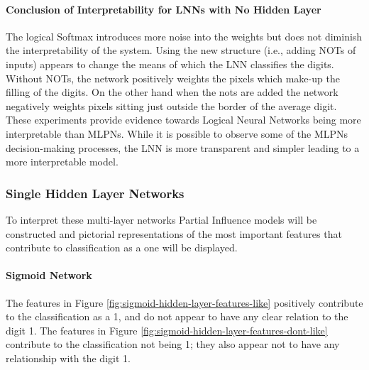 \paragraph{Conclusion of Interpretability for LNNs with No Hidden Layer}
The logical Softmax introduces more noise into the weights but does not diminish the interpretability of the system. Using the new structure (i.e., adding NOTs of inputs) appears to change the means of which the LNN classifies the digits. Without NOTs, the network positively weights the pixels which make-up the filling of the digits. On the other hand when the nots are added the network negatively weights pixels sitting just outside the border of the average digit. These experiments provide evidence towards Logical Neural Networks being more interpretable than MLPNs. While it is possible to observe some of the MLPNs decision-making processes, the LNN is more transparent and simpler leading to a more interpretable model.

\subsubsection{Single Hidden Layer Networks}
To interpret these multi-layer networks Partial Influence models will be constructed and pictorial representations of the most important features that contribute to classification as a one will be displayed.

\paragraph{Sigmoid Network}
	The features in Figure \ref{fig:sigmoid-hidden-layer-features-like} positively contribute to the classification as a 1, and do not appear to have any clear relation to the digit 1. The features in Figure \ref{fig:sigmoid-hidden-layer-features-dont-like} contribute to the classification not being 1; they also appear not to have any relationship with the digit 1.

